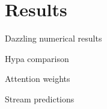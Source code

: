 
\section{Results}
\label{sec:results}

Dazzling numerical results

Hypa comparison

Attention weights

Stream predictions

